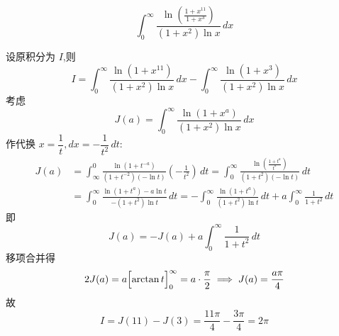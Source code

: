 \begin{questions}
    \question 
    \[
    \int_0^{\infty} \frac{\ln\left(\frac{1 + x^{11}}{1 + x^3}\right)}{(1 + x^2)\ln x} \, dx
    \]
    \begin{solution}
        设原积分为 $I$,则
        \[
        I = \int_0^{\infty} \frac{\ln(1+x^{11})}{(1+x^2)\ln x} \, dx - \int_0^{\infty} \frac{\ln(1+x^3)}{(1+x^2)\ln x} \, dx
        \]
        考虑 
        \[
        J(a) = \int_0^{\infty} \frac{\ln(1+x^a)}{(1+x^2)\ln x} \, dx
        \]
        作代换 $x = \dfrac{1}{t},dx = -\dfrac{1}{t^2} \, dt$:
        \begin{align*}
        J(a) &= \int_{\infty}^{0} \frac{\ln(1+t^{-a})}{(1+t^{-2})(-\ln t)} \left(-\frac{1}{t^2}\right) \, dt = \int_0^{\infty} \frac{\ln\left(\frac{1+t^a}{t^a}\right)}{(1+t^2)(-\ln t)} \, dt \\
        &= \int_0^{\infty} \frac{\ln(1+t^a) - a\ln t}{-(1+t^2)\ln t} \, dt = -\int_0^{\infty} \frac{\ln(1+t^a)}{(1+t^2)\ln t} \, dt + a \int_0^{\infty} \frac{1}{1+t^2} \, dt
        \end{align*}
        即
        \[
        J(a) = -J(a) + a \int_0^{\infty} \frac{1}{1+t^2} \, dt
        \]
        移项合并得
        \[
        2J(a) = a \Bigl[ \arctan t \Bigr]_0^{\infty} = a \cdot \frac{\pi}{2} \implies J(a) = \frac{a\pi}{4}
        \]
        故
        \[
        I = J(11) - J(3) = \frac{11\pi}{4} - \frac{3\pi}{4}= 2\pi
        \]
    \end{solution}


\end{questions}
